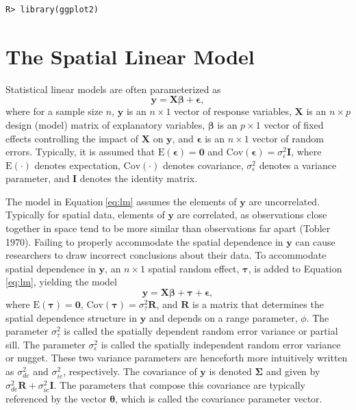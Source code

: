 \documentclass{article}
\begin{document}
\begin{verbatim}
R> library(ggplot2)
\end{verbatim}

\hypertarget{sec:theomodel}{%
\section{The Spatial Linear Model}\label{sec:theomodel}}

Statistical linear models are often parameterized as
\begin{equation}\label{eq:lm}
 \mathbf{y} = \mathbf{X} \boldsymbol{\beta} + \boldsymbol{\epsilon},
\end{equation} where for a sample size \(n\), \(\mathbf{y}\) is an
\(n \times 1\) vector of response variables, \(\mathbf{X}\) is an
\(n \times p\) design (model) matrix of explanatory variables,
\(\boldsymbol{\beta}\) is an \(p \times 1\) vector of fixed effects
controlling the impact of \(\mathbf{X}\) on \(\mathbf{y}\), and
\(\boldsymbol{\epsilon}\) is an \(n \times 1\) vector of random errors.
Typically, it is assumed that
\(\text{E}(\boldsymbol{\epsilon}) = \mathbf{0}\) and
\(\text{Cov}(\boldsymbol{\epsilon}) = \sigma^2_\epsilon \mathbf{I}\),
where \(\text{E}(\cdot)\) denotes expectation, \(\text{Cov}(\cdot)\)
denotes covariance, \(\sigma^2_\epsilon\) denotes a variance parameter,
and \(\mathbf{I}\) denotes the identity matrix.

The model in Equation\(~\)\ref{eq:lm} assumes the elements of
\(\mathbf{y}\) are uncorrelated. Typically for spatial data, elements of
\(\mathbf{y}\) are correlated, as observations close together in space
tend to be more similar than observations far apart (Tobler 1970).
Failing to properly accommodate the spatial dependence in \(\mathbf{y}\)
can cause researchers to draw incorrect conclusions about their data. To
accommodate spatial dependence in \(\mathbf{y}\), an \(n \times 1\)
spatial random effect, \(\boldsymbol{\tau}\), is added to
Equation\(~\)\ref{eq:lm}, yielding the model
\begin{equation}\label{eq:splm}
 \mathbf{y} = \mathbf{X} \boldsymbol{\beta} + \boldsymbol{\tau} + \boldsymbol{\epsilon},
\end{equation} where \(\text{E}(\boldsymbol{\tau}) = \mathbf{0}\),
\(\text{Cov}(\boldsymbol{\tau}) = \sigma^2_\tau \mathbf{R}\), and
\(\mathbf{R}\) is a matrix that determines the spatial dependence
structure in \(\mathbf{y}\) and depends on a range parameter, \(\phi\).
The parameter \(\sigma^2_\tau\) is called the spatially dependent random
error variance or partial sill. The parameter \(\sigma^2_\epsilon\) is
called the spatially independent random error variance or nugget. These
two variance parameters are henceforth more intuitively written as
\(\sigma^2_{de}\) and \(\sigma^2_{ie}\), respectively. The covariance of
\(\mathbf{y}\) is denoted \(\boldsymbol{\Sigma}\) and given by
\(\sigma^2_{de} \mathbf{R} + \sigma^2_{ie} \mathbf{I}\). The parameters
that compose this covariance are typically referenced by the vector
\(\boldsymbol{\theta}\), which is called the covariance parameter
vector.
\end{document}
